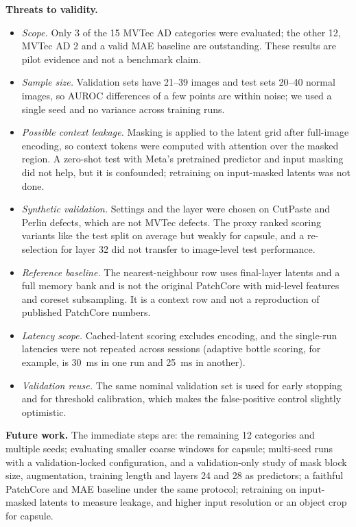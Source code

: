 \documentclass[conference]{IEEEtran}
\begin{document}
\textbf{Threats to validity.}
\begin{itemize}
\item \emph{Scope.} Only 3 of the 15 MVTec AD categories were evaluated; the other 12, MVTec AD 2 and a valid MAE baseline are outstanding. These results are pilot evidence and not a benchmark claim.
\item \emph{Sample size.} Validation sets have 21--39 images and test sets 20--40 normal images, so AUROC differences of a few points are within noise; we used a single seed and no variance across training runs.
\item \emph{Possible context leakage.} Masking is applied to the latent grid after full-image encoding, so context tokens were computed with attention over the masked region. A zero-shot test with Meta's pretrained predictor and input masking did not help, but it is confounded; retraining on input-masked latents was not done.
\item \emph{Synthetic validation.} Settings and the layer were chosen on CutPaste and Perlin defects, which are not MVTec defects. The proxy ranked scoring variants like the test split on average but weakly for capsule, and a re-selection for layer 32 did not transfer to image-level test performance.
\item \emph{Reference baseline.} The nearest-neighbour row uses final-layer latents and a full memory bank and is not the original PatchCore with mid-level features and coreset subsampling. It is a context row and not a reproduction of published PatchCore numbers.
\item \emph{Latency scope.} Cached-latent scoring excludes encoding, and the single-run latencies were not repeated across sessions (adaptive bottle scoring, for example, is 30~ms in one run and 25~ms in another).
\item \emph{Validation reuse.} The same nominal validation set is used for early stopping and for threshold calibration, which makes the false-positive control slightly optimistic.
\end{itemize}

\textbf{Future work.} The immediate steps are: the remaining 12 categories and multiple seeds; evaluating smaller coarse windows for capsule; multi-seed runs with a validation-locked configuration, and a validation-only study of mask block size, augmentation, training length and layers 24 and 28 as predictors; a faithful PatchCore and MAE baseline under the same protocol; retraining on input-masked latents to measure leakage, and higher input resolution or an object crop for capsule.
\end{document}
